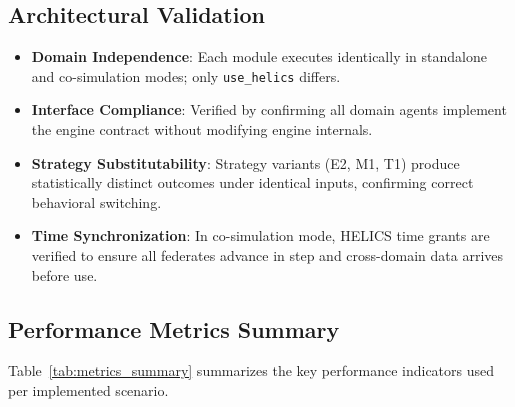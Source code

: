 \subsection{Architectural Validation}

\begin{itemize}
    \item \textbf{Domain Independence}: Each module executes identically in standalone and co-simulation modes; only \texttt{use\_helics} differs.
    \item \textbf{Interface Compliance}: Verified by confirming all domain agents implement the engine contract without modifying engine internals.
    \item \textbf{Strategy Substitutability}: Strategy variants (E2, M1, T1) produce statistically distinct outcomes under identical inputs, confirming correct behavioral switching.
    \item \textbf{Time Synchronization}: In co-simulation mode, HELICS time grants are verified to ensure all federates advance in step and cross-domain data arrives before use.
\end{itemize}

\subsection{Performance Metrics Summary}

Table~\ref{tab:metrics_summary} summarizes the key performance indicators used per implemented scenario.

